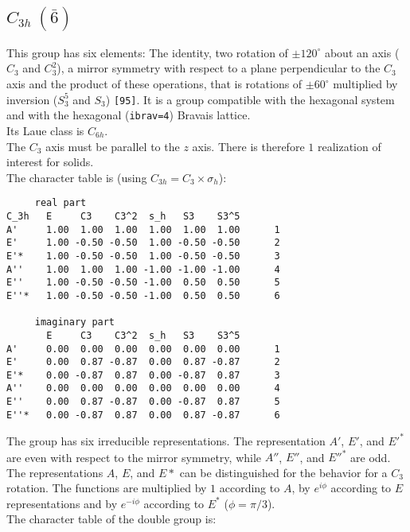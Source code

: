 \documentclass[12pt,a4paper]{article}
\begin{document}
\subsection{\color{web-blue}$C_{3h}\ (\bar 6)$}  
This group has six elements: The identity, two rotation of $\pm120^\circ$ 
about an axis ($C_3$ and $C_3^2$), a mirror symmetry with respect to a 
plane perpendicular to the $C_3$ axis and the product of these operations, 
that is rotations of $\pm60^\circ$ multiplied by inversion 
($S_3^5$ and $S_3$) \texttt{[95]}.
It is a group compatible with the hexagonal system and with the  
hexagonal (\texttt{ibrav=4}) Bravais lattice. \\ 
Its Laue class is $C_{6h}$. \\
The $C_3$ axis must be parallel to the $z$ axis. There is therefore
$1$ realization of interest for solids. \\
The character table is (using $C_{3h}=C_3 \times \sigma_h$):
\begin{verbatim}
     real part
C_3h   E     C3    C3^2  s_h   S3    S3^5 
A'     1.00  1.00  1.00  1.00  1.00  1.00      1
E'     1.00 -0.50 -0.50  1.00 -0.50 -0.50      2
E'*    1.00 -0.50 -0.50  1.00 -0.50 -0.50      3
A''    1.00  1.00  1.00 -1.00 -1.00 -1.00      4
E''    1.00 -0.50 -0.50 -1.00  0.50  0.50      5
E''*   1.00 -0.50 -0.50 -1.00  0.50  0.50      6

     imaginary part
       E     C3    C3^2  s_h   S3    S3^5 
A'     0.00  0.00  0.00  0.00  0.00  0.00      1
E'     0.00  0.87 -0.87  0.00  0.87 -0.87      2
E'*    0.00 -0.87  0.87  0.00 -0.87  0.87      3
A''    0.00  0.00  0.00  0.00  0.00  0.00      4
E''    0.00  0.87 -0.87  0.00 -0.87  0.87      5
E''*   0.00 -0.87  0.87  0.00  0.87 -0.87      6
\end{verbatim}
The group has six irreducible representations. The representation 
$A'$, $E'$, and $E'^*$ are even with respect to the mirror symmetry, while
$A''$, $E''$, and $E''^*$ are odd. The representations $A$, $E$, and $E*$
can be distinguished for the behavior for a $C_3$ rotation. 
The functions are multiplied by $1$ according to $A$, by $e^{i\phi}$ according to 
$E$ representations and by $e^{-i\phi}$ according to $E^*$ ($\phi=\pi /3$). \\
The character table of the double group is:
\end{document}

